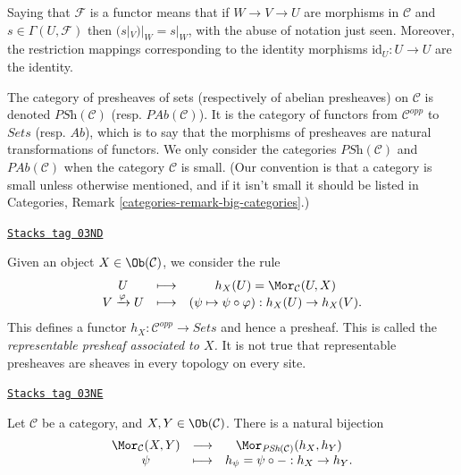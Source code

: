 \medskip\noindent
Saying that $\mathcal{F}$ is a functor means that if
$W \to V \to U$ are morphisms in $\mathcal{C}$ and
$s \in \Gamma(U, \mathcal{F})$ then
$(s|_V)|_W = s |_W$, with the abuse of
notation just seen. Moreover, the restriction mappings corresponding to
the identity morphisms $\text{id}_U : U \to U$ are the identity.

\medskip\noindent
The category of presheaves of sets (respectively of abelian presheaves) on
$\mathcal{C}$ is denoted $\textit{PSh} (\mathcal{C})$ (resp. $\textit{PAb}
(\mathcal{C})$). It is the category of functors from $\mathcal{C}^{opp}$ to
$\textit{Sets}$ (resp. $\textit{Ab}$), which is to say that the morphisms of
presheaves are natural transformations of functors. We only consider the
categories $\textit{PSh}(\mathcal{C})$ and $\textit{PAb}(\mathcal{C})$
when the category $\mathcal{C}$ is small. (Our convention is that a category
is small unless otherwise mentioned, and if it isn't small it should be
listed in Categories, Remark \ref{categories-remark-big-categories}.)

\begin{example}
\label{etale-cohomology-example-representable-presheaf}
\href{https://stacks.math.columbia.edu/tag/03ND}{\texttt{Stacks tag 03ND}}

Given an object $X \in \Ob(\mathcal{C})$, we consider the rule
$$
\begin{matrix}
U & \longmapsto & h_X(U) = \Mor_\mathcal{C}(U, X) \\
V \xrightarrow{\varphi} U & \longmapsto &
(\psi \mapsto \psi \circ \varphi) : h_X(U) \to h_X(V).
\end{matrix}
$$
This defines a functor $h_X : \mathcal{C}^{opp} \to \textit{Sets}$
and hence a presheaf. This is called the
{\it representable presheaf associated to $X$.}
It is not true that representable presheaves are sheaves in every topology on
every site.
\end{example}

\begin{lemma}
\label{etale-cohomology-lemma-yoneda}
\href{https://stacks.math.columbia.edu/tag/03NE}{\texttt{Stacks tag 03NE}}


Let $\mathcal{C}$ be a category, and $X, Y \in
\Ob(\mathcal{C})$. There is a natural bijection
$$
\begin{matrix}
\Mor_\mathcal{C}(X, Y) &
\longrightarrow &
\Mor_{\textit{PSh}(\mathcal{C})} (h_X, h_Y) \\
\psi &
\longmapsto &
h_\psi = \psi \circ - : h_X \to h_Y.
\end{matrix}
$$
\end{lemma}

